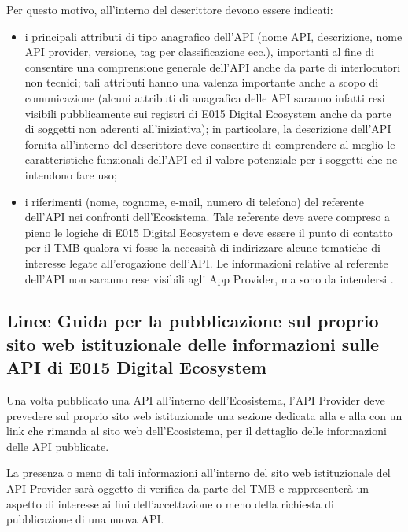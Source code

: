 \documentclass[letterpaper,10pt,italian]{sphinxmanual}
\begin{document}
Per questo motivo, all’interno del descrittore devono essere indicati:
\begin{itemize}
\item {} 
i principali attributi di tipo anagrafico dell’API (nome API, descrizione, nome API provider, versione, tag per classificazione ecc.), importanti al fine di consentire una comprensione generale dell’API anche da parte di interlocutori non tecnici; tali attributi hanno una valenza importante anche a scopo di comunicazione (alcuni attributi di anagrafica delle API saranno infatti resi visibili pubblicamente sui registri di E015 Digital Ecosystem anche da parte di soggetti non aderenti all’iniziativa); in particolare, la descrizione dell’API fornita all’interno del descrittore deve consentire di comprendere al meglio le caratteristiche funzionali dell’API ed il valore potenziale per i soggetti che ne intendono fare uso;

\item {} 
i riferimenti (nome, cognome, e-mail, numero di telefono) del referente dell’API nei confronti dell’Ecosistema. Tale referente deve avere compreso a pieno le logiche di E015 Digital Ecosystem e deve essere il punto di contatto per il  TMB qualora vi fosse la necessità di indirizzare alcune tematiche di interesse legate all’erogazione dell’API. Le informazioni relative al referente dell’API non saranno rese visibili agli App Provider, ma sono da intendersi .

\end{itemize}


\subsection{Linee Guida per la pubblicazione sul proprio sito web istituzionale delle informazioni sulle API di E015 Digital Ecosystem}
\label{\detokenize{sez26:sezione263}}\label{\detokenize{sez26:linee-guida-per-la-pubblicazione-sul-proprio-sito-web-istituzionale-delle-informazioni-sulle-api-di-e015-digital-ecosystem}}
Una volta pubblicato una API all’interno dell’Ecosistema, l’API Provider deve prevedere sul proprio sito web istituzionale una sezione dedicata alla  e alla  con un link che rimanda al sito web dell’Ecosistema, per il dettaglio delle informazioni delle API pubblicate.

La presenza o meno di tali informazioni all’interno del sito web istituzionale del API Provider sarà oggetto di verifica da parte del TMB e rappresenterà un aspetto di interesse ai fini dell’accettazione o meno della richiesta di pubblicazione di una nuova API.
\end{document}
